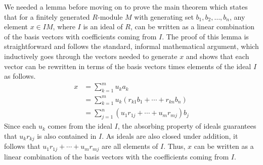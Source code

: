 \documentclass{article}
\begin{document}
We needed a lemma before moving on to prove the main theorem which states that
for a finitely generated $R$-module \(M\) with generating set
\(b_{1}, b_{2}, \dots, b_{n}\), any element \(x\in I M\), where \(I\) is an
ideal of $R$, can be written as a linear combination of the basis vectors with
coefficients coming from \(I\). 
 The proof of this lemma is straightforward and
follows the standard, informal mathematical argument, which inductively goes
through the vectors needed to generate \(x\) and shows that each vector can be
rewritten in terms of the basis vectors times elements of the ideal \(I\) as
follows.
\begin{align*}
  x & = \sum_{k=1}^{m} u_{k} a_{k} \\
    & = \sum_{k=1}^{m} u_{k} (r_{k1} b_{1} + \cdots + r_{kn} b_{n}) \\
    & = \sum_{j=1}^{n} (u_{1} r_{1j} + \cdots + u_{m} r_{mj}) b_{j}
\end{align*}
Since each \(u_{k}\) comes from the ideal \(I\), the absorbing property of
ideals guarantees that \(u_{k} r_{k j}\) is also contained in \(I\). As ideals
are also closed under addition, it follows that \(u_{1} r_{1j} + \cdots +
u_{m} r_{m j}\) are all elements of \(I\). Thus, \(x\) can be written as a
linear combination of the basis vectors with the coefficients coming from
\(I\).

\end{document}
